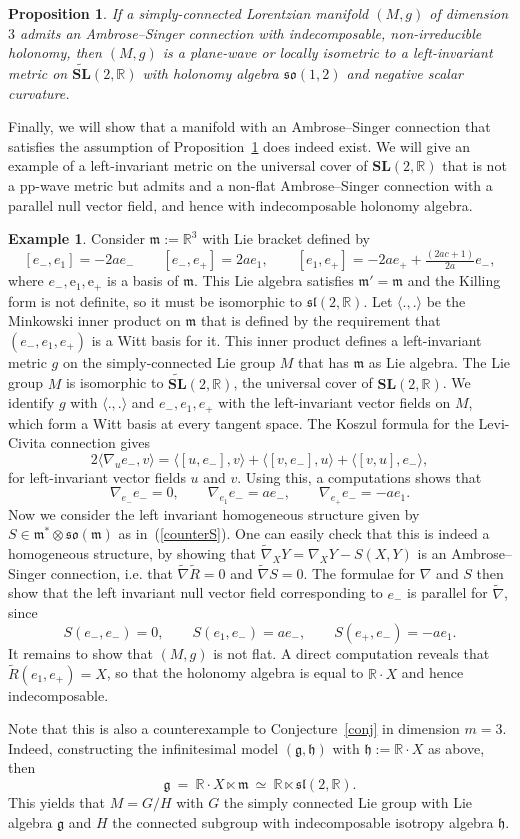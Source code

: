 \documentclass[11pt,a4paper]{amsart}
\newcommand{\tnab}{\widetilde{\nabla}}
\newcommand{\tR}{\widetilde{R}}
\newcommand{\g}{\mathfrak{g}}
\newcommand{\h}{\mathfrak{h}}
\newcommand{\m}{\mathfrak{m}}
\renewcommand{\sl}{\mathfrak{sl}}
\newcommand{\+}{\oplus}
\newcommand{\so}{\mathfrak{so}}
\newcommand{\SL}{\mathbf{SL}}
\newcommand{\1}{\mathbf{1}}
\newcommand{\e}{\mathrm{e}}
\newcommand{\R}{\mathbb{R}} %
\newcommand{\<}{\langle}
\renewcommand{\>}{\rangle}
\theoremstyle{definition}
\newtheorem{example}[definition]{Example}
\theoremstyle{plain}
\newtheorem{proposition}[definition]{Proposition}
\numberwithin{equation}{section}
\begin{document}
\begin{proposition}\label{finalprop}
If  a simply-connected Lorentzian manifold $(M,g)$ of dimension $3$ admits an Ambrose--Singer connection with indecomposable, non-irreducible holonomy, then $(M,g)$ is a plane-wave or locally isometric to a left-invariant metric on $\widetilde{\SL}(2,\R)$ with holonomy algebra $\so(1,2)$ and negative scalar curvature.
\end{proposition}
Finally, we will show that a manifold with an Ambrose--Singer connection that satisfies the assumption of Proposition~\ref{finalprop} does indeed exist. We will give an example of a left-invariant metric on the universal cover of $\SL(2,\R)$ that is not a pp-wave metric but admits and  a non-flat Ambrose--Singer connection with a parallel null vector field, and hence with indecomposable holonomy algebra.
\begin{example}\label{counterex}
Consider $\m:=\R^3$ with Lie bracket defined by
\[ [e_-,e_1] =-2a e_-\qquad [e_-,e_+] =2ae_1,\qquad [e_1,e_+] =-2ae_++ \tfrac{(2ac+1)}{2a}e_- ,\]
where  $e_-,\e_1,\e_+$ is a basis of $\m$.
This Lie algebra satisfies $\m'=\m$ and the Killing form is not definite, so it must be isomorphic to $\sl(2,\R)$. Let $\<.,.\>$ be the Minkowski inner product on $\m$ that is defined by the requirement that $(e_-,e_1,e_+)$ is a Witt basis for it. This inner product defines a left-invariant metric $g$ on the simply-connected Lie group $M$ that has $\m$ as Lie algebra.  The Lie group $M$ is isomorphic to $\widetilde{\SL}(2,\R)$, the universal cover of $\SL(2,\R)$. We identify 
 $g$ with $\<.,.\>$ and $e_-,e_1,e_+$ with the left-invariant vector fields on $M$, which form a Witt basis at every tangent space. The Koszul formula for the Levi-Civita connection gives
\[2\< \nabla_ue_-,v\>=\< [u,e_-],v\> + \< [v,e_-],u\>+ \< [v,u],e_-\>,\]
for left-invariant vector fields $u$ and $v$.
Using this, a computations shows that 
\[
\nabla_{e_-}e_-=0,\qquad \nabla_{e_1}e_-=ae_-,\qquad \nabla_{e_+}e_-=-ae_1.\]
Now we consider the left invariant homogeneous structure given by $S\in \m^*\otimes \so(\m)$ as in~(\ref{counterS}). One can easily check that this is indeed a homogeneous structure, by showing that $\tnab_XY =\nabla_XY-S(X,Y)$ is an Ambrose--Singer connection, i.e. that $\tnab \tR=0$ and $\tnab S=0$. The formulae for $\nabla$ and $S$ then show that the left invariant null vector field corresponding to $e_-$ is parallel for $\tnab$, since
\[S(e_-,e_-)=0,\qquad S(e_1,e_-)=ae_-,\qquad S(e_+,e_-)=-a e_1.\]
It remains to show that $(M,g)$ is not flat. A direct computation reveals that 
$\tR(e_1,e_+)=X$, so that the holonomy algebra is equal to $\R\cdot X$ and hence indecomposable. 

Note that this is also a counterexample to Conjecture~\ref{conj} in dimension  $m=3$. Indeed, constructing the infinitesimal model $(\g,\h)$ with $\h:=\R\cdot X$ as above, then 
\[\g\ =\ \R\cdot X\ltimes \m\ \simeq\   \R\ltimes \sl(2,\R).\] This yields that $M=G/H$ with $ G$ the simply connected Lie group with Lie algebra $\g$ and $H$ the connected subgroup with indecomposable isotropy  algebra $\h$.
\end{example}
\end{document}
